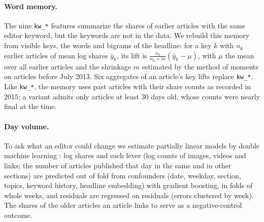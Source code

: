 \documentclass[10pt,a4paper,twocolumn]{article}
\begin{document}
\paragraph{Word memory.} The nine \texttt{kw\_*} features summarize the shares of earlier articles with the same
editor keyword, but the keywords are not in the data. We rebuild this memory from visible keys, the words and
bigrams of the headline: for a key $k$ with $n_k$ earlier articles of mean log shares $\bar y_k$, its lift is
$\frac{n_k}{n_k+m}(\bar y_k-\mu)$, with $\mu$ the mean over all earlier articles and the shrinkage $m$ estimated by
the method of moments on articles before July 2013. Six aggregates of an article's key lifts replace \texttt{kw\_*}. Like \texttt{kw\_*}, the
memory uses past articles with their share counts as recorded in 2015; a variant admits only articles at least 30
days old, whose counts were nearly final at the time.

\paragraph{Day volume.} To ask what an editor could change we estimate partially linear models by double machine
learning \citep{chernozhukov2018}: log shares and each lever (log counts of images, videos and links; the number
of articles published that day in the same and in other sections) are predicted out of fold from confounders
(date, weekday, section, topics, keyword history, headline embedding) with
gradient boosting, in folds of whole weeks, and residuals are regressed on residuals (errors clustered by week). The shares of the older articles an article links to serve as a negative-control outcome.
\end{document}
